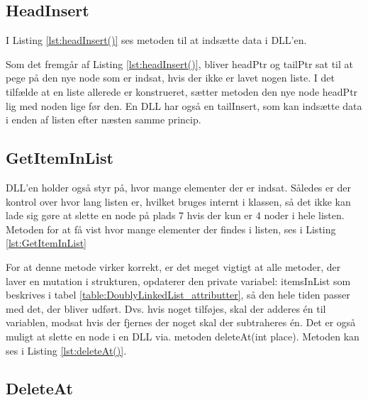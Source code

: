 \clearpage

\subsection{HeadInsert}

I Listing \ref{lst:headInsert()} ses metoden til at indsætte data i DLL'en.



Som det fremgår af Listing \ref{lst:headInsert()}, bliver headPtr og tailPtr sat til at pege på den nye node som er indsat, hvis der ikke er lavet nogen liste. I det tilfælde at en liste allerede er konstrueret, sætter metoden den nye node headPtr lig med noden lige før den. En DLL har også en tailInsert, som kan indsætte data i enden af listen efter næsten samme princip. 

\subsection{GetItemInList}
DLL'en holder også styr på, hvor mange elementer der er indsat. Således er der kontrol over hvor lang listen er, hvilket bruges internt i klassen, så det ikke kan lade sig gøre at slette en node på plads 7 hvis der kun er 4 noder i hele listen. Metoden for at få vist hvor mange elementer der findes i listen, ses i Listing \ref{lst:GetItemInList} 



For at denne metode virker korrekt, er det meget vigtigt at alle metoder, der laver en mutation i strukturen, opdaterer den private variabel: itemsInList som beskrives i tabel \ref{table:DoublyLinkedList_attributter}, så den hele tiden passer med det, der bliver udført. Dvs. hvis noget tilføjes, skal der adderes én til variablen, modsat hvis der fjernes der noget skal der subtraheres én.
Det er også muligt at slette en node i en DLL via. metoden deleteAt(int place). Metoden kan ses i Listing \ref{lst:deleteAt()}. \clearpage



\subsection{DeleteAt}


